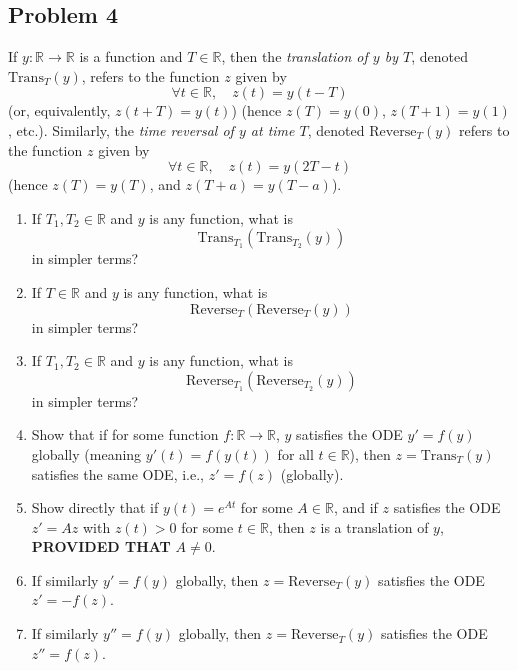 \documentclass{article}
\newcommand{\R}{{\mathbb R}}
\begin{document}
\subsection*{Problem 4}
If $y \colon \R \to \R$ is a function and $T \in \R$,
then the \emph{translation of $y$ by $T$},
denoted $\mathrm{Trans}_T(y)$, refers to the function $z$ given by
\[
	\forall t \in \R, \quad z(t) = y(t-T)
\]
(or, equivalently, $z(t+T) = y(t)$)
(hence $z(T) = y(0)$, $z(T+1) = y(1)$, etc.).
Similarly, the \emph{time reversal of $y$ at time $T$},
denoted $\mathrm{Reverse}_T(y)$ refers to the function $z$ given by
\[
	\forall t \in \R, \quad z(t) = y(2T - t)
\]
(hence $z(T) = y(T)$, and $z(T+a) = y(T-a)$).
\begin{enumerate}
	\item If $T_1,T_2 \in \R$ and $y$ is any function, what is
		\[
			\mathrm{Trans}_{T_1}(\mathrm{Trans}_{T_2}(y))
		\]
		in simpler terms?
	\item If $T \in \R$ and $y$ is any function, what is
		\[
			\mathrm{Reverse}_T(\mathrm{Reverse}_T(y))
		\]
		in simpler terms?
	\item If $T_1,T_2 \in \R$ and $y$ is any function, what is
		\[
			\mathrm{Reverse}_{T_1}(\mathrm{Reverse}_{T_2}(y))
		\]
		in simpler terms?
	\item Show that if for some function $f \colon \R \to \R$,
		$y$ satisfies the ODE $y' = f(y)$ globally
		(meaning $y'(t) = f(y(t))$ for all $t \in \R$),
		then $z = \mathrm{Trans}_T(y)$ satisfies the same ODE,
		i.e., $z' = f(z)$ (globally).
	\item Show directly that if $y(t) = e^{At}$ for some $A \in \R$,
		and if $z$ satisfies the ODE $z' = Az$ with $z(t) > 0$ for some $t \in \R$,
		then $z$ is a translation of $y$, \textbf{PROVIDED THAT} $A \neq 0$.
	\item If similarly $y' = f(y)$ globally,
		then $z = \mathrm{Reverse}_T(y)$ satisfies the ODE $z' = -f(z)$.
	\item If similarly $y'' = f(y)$ globally,
		then $z = \mathrm{Reverse}_T(y)$ satisfies the ODE $z'' = f(z)$.
\end{enumerate}
\end{document}
